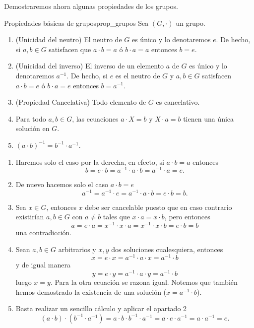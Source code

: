 Demostraremos ahora algunas propiedades de los grupos.

\begin{lemma}{Propiedades básicas de grupos}{prop_grupos}
    Sea \((G,\cdot)\) un grupo.
    \begin{enumerate}
    \item {(Unicidad del neutro)} El neutro de \(G\) es único y lo denotaremos \(e\). De hecho, si \(a,b\in G\) satisfacen que \(a\cdot b = a\) ó \(b\cdot a = a\) entonces \(b = e\).
    \item {(Unicidad del inverso)} El inverso de un elemento \(a\) de \(G\) es único y lo denotaremos \(a^{-1}\). De hecho, si \(e\) es el neutro de \(G\) y \(a,b\in G\) satisfacen \(a\cdot b = e\) ó \(b\cdot a = e\) entonces \(b = a^{-1}\).
    \item {(Propiedad Cancelativa)} Todo elemento de \(G\) es cancelativo.
    \item Para todo \(a,b\in G\), las ecuaciones \(a\cdot X = b\) y \(X\cdot a = b\) tienen una única solución en \(G\).
    \item \((a\cdot b)^{-1} = b^{-1}\cdot a^{-1}\).
    \end{enumerate}
\end{lemma}

\begin{proofbox}
    \begin{enumerate}
    \item
        Haremos solo el caso por la derecha, en efecto, si $a \cdot b = a$ entonces
        \[
        b = e \cdot b = a^{-1} \cdot a \cdot b = a^{-1} \cdot a = e.
        \]

    \item
        De nuevo hacemos solo el caso \(a\cdot b = e\)
        \[
        a^{-1} = a^{-1} \cdot e = a^{-1} \cdot a \cdot b = e \cdot b = b.
        \]

    \item
        Sea $x \in G$, entonces $x$ debe ser cancelable puesto que en caso contrario existirían $a,b \in G$ con $a \neq b$ tales que $x \cdot a = x \cdot b$, pero entonces
        \[
        a = e \cdot a = x^{-1} \cdot x \cdot a = x^{-1} \cdot x \cdot b = e \cdot b = b
        \]
        una contradicción.

    \item
        Sean $a,b \in G$ arbitrarios y $x,y$ dos soluciones cualesquiera, entonces
        \[
        x = e \cdot x = a^{-1} \cdot a \cdot x = a^{-1} \cdot b
        \]
        y de igual manera
        \[
        y = e \cdot y = a^{-1} \cdot a \cdot y = a^{-1} \cdot b
        \]
        luego $x=y$. Para la otra ecuación se razona igual. Notemos que también hemos demostrado la existencia de una solución ($x = a^{-1} \cdot b$).

    \item
        Basta realizar un sencillo cálculo y aplicar el apartado 2
        \[
        (a \cdot b) \cdot (b^{-1} \cdot a^{-1}) = a \cdot b \cdot b^{-1} \cdot a^{-1} = a \cdot e \cdot a^{-1} = a \cdot a^{-1} = e.
        \]

    \end{enumerate}
\end{proofbox}

